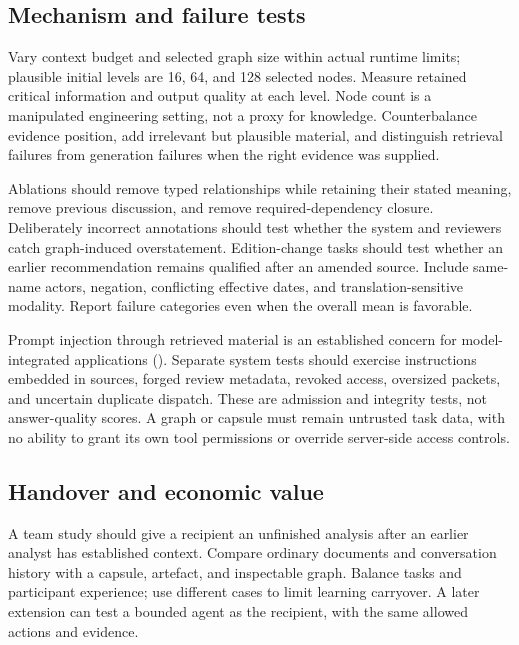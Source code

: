 \documentclass[
  11pt,
]{article}
\begin{document}
\subsection{Mechanism and failure
tests}\label{mechanism-and-failure-tests}

Vary context budget and selected graph size within actual runtime
limits; plausible initial levels are 16, 64, and 128 selected nodes.
Measure retained critical information and output quality at each level.
Node count is a manipulated engineering setting, not a proxy for
knowledge. Counterbalance evidence position, add irrelevant but
plausible material, and distinguish retrieval failures from generation
failures when the right evidence was supplied.

Ablations should remove typed relationships while retaining their stated
meaning, remove previous discussion, and remove required-dependency
closure. Deliberately incorrect annotations should test whether the
system and reviewers catch graph-induced overstatement. Edition-change
tasks should test whether an earlier recommendation remains qualified
after an amended source. Include same-name actors, negation, conflicting
effective dates, and translation-sensitive modality. Report failure
categories even when the overall mean is favorable.

Prompt injection through retrieved material is an established concern
for model-integrated applications (). Separate system tests should exercise instructions
embedded in sources, forged review metadata, revoked access, oversized
packets, and uncertain duplicate dispatch. These are admission and
integrity tests, not answer-quality scores. A graph or capsule must
remain untrusted task data, with no ability to grant its own tool
permissions or override server-side access controls.

\subsection{Handover and economic
value}\label{handover-and-economic-value}

A team study should give a recipient an unfinished analysis after an
earlier analyst has established context. Compare ordinary documents and
conversation history with a capsule, artefact, and inspectable graph.
Balance tasks and participant experience; use different cases to limit
learning carryover. A later extension can test a bounded agent as the
recipient, with the same allowed actions and evidence.
\end{document}
